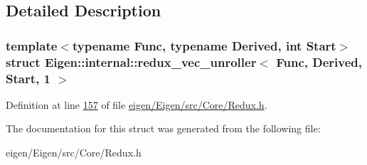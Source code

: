 \subsection{Detailed Description}
\subsubsection*{template$<$typename Func, typename Derived, int Start$>$\newline
struct Eigen\+::internal\+::redux\+\_\+vec\+\_\+unroller$<$ Func, Derived, Start, 1 $>$}



Definition at line \hyperlink{eigen_2_eigen_2src_2_core_2_redux_8h_source_l00157}{157} of file \hyperlink{eigen_2_eigen_2src_2_core_2_redux_8h_source}{eigen/\+Eigen/src/\+Core/\+Redux.\+h}.



The documentation for this struct was generated from the following file\+:\begin{DoxyCompactItemize}
\item 
eigen/\+Eigen/src/\+Core/\+Redux.\+h\end{DoxyCompactItemize}
